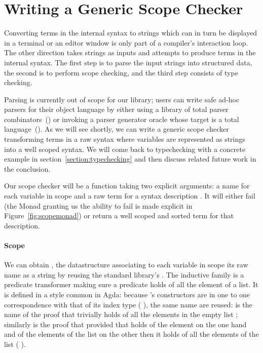 \section{Writing a Generic Scope Checker}\label{section:genericscoping}

Converting terms in the internal syntax to strings which can in turn be
displayed in a terminal or an editor window is only part of a compiler's
interaction loop. The other direction takes strings as inputs and attempts to
produce terms in the internal syntax. The first step is to parse the input
strings into structured data, the second is to perform scope checking,
and the third step consists of type checking.

Parsing is currently out of scope for our library; users can write safe
ad-hoc parsers for their object language by either using a library of total
parser combinators~(\cite{DBLP:conf/icfp/Danielsson10,allais2018agdarsec})
or invoking a parser generator oracle whose target is a total
language~(\cite{Stump:2016:VFP:2841316}). As we will see shortly, we can
write a generic scope checker transforming terms in a raw syntax where
variables are represented as strings into a well scoped syntax. We will
come back to typechecking with a concrete example in section~\ref{section:typechecking}
and then discuss related future work in the conclusion.

Our scope checker will be a function taking two explicit arguments: a name for
each variable in scope  and a raw term for a syntax description .
It will either fail (the Monad  granting us the ability to fail is made
explicit in Figure~\ref{fig:scopemonad}) or return a well scoped and sorted
term for that description.

\begin{agdasnippet}
\end{agdasnippet}

\paragraph{Scope} We can obtain , the datastructure associating to
each variable in scope its raw name as a string by reusing the standard library's
. The inductive family  is a predicate transformer making sure a
predicate holds of all the element of a list. It is defined in a style common in
Agda: because 's constructors are in one to one correspondence with that
of its index type ( ), the same name are reused: \AIC{[]} is the
name of the proof that  trivially holds of all the elements in the empty
list \AIC{[]}; similarly  is the proof that provided that  holds
of the element  on the one hand and of the elements of the list 
on the other then it holds of all the elements of the list (  ).

